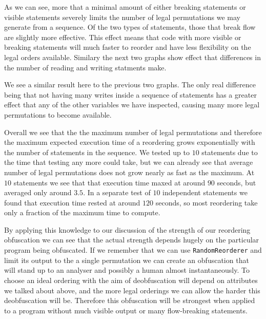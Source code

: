 \documentclass[twoside,a4paper]{report}
\begin{document}
\begin{figure}[h]
\centering
{}
\end{figure}

As we can see, more that a minimal amount of either breaking statements or visible statements severely limits the number of legal permutations we may
generate from a sequence. Of the two types of statements, those that break flow are slightly more effective. This effect means that code with more
visible or breaking statements will much faster to reorder and have less flexibility on the legal orders available. Similary the next two graphs show
effect that differences in the number of reading and writing statments make.

\begin{figure}[h]
\centering
{}
\end{figure}

We see a similar result here to the previous two graphs. The only real difference being that not having many writes inside a sequence of statements
has a greater effect that any of the other variables we have inspected, causing many more legal permutations to become available.

Overall we see that the the maximum number of legal permutations and therefore the maximum expected execution time of a reordering grows exponentially
with the number of statements in the sequence. We tested up to $10$ statements due to the time that testing any more could take, but we can already see
that average number of legal permutations does not grow nearly as fast as the maximum. At $10$ statements we see that that execution time maxed at around
$90$ seconds, but averaged only around $3.5$. In a separate test of $10$ independent statements we found that execution time rested at around $120$ seconds,
so most reordering take only a fraction of the maximum time to compute.

By applying this knowledge to our discussion of the strength of our reordering obfuscation we can see that the actual strength depends hugely on the
particular program being obfuscated. If we remember that we can use \texttt{RandomReorderer} and limit its output to the a single permutation we can
create an obfuscation that will stand up to an analyser and possibly a human almost instantaneously. To choose an ideal ordering with the aim of
deobfuscation will depend on attributes we talked about above, and the more legal orderings we can allow the harder this deobfuscation will be. Therefore
this obfuscation will be strongest when applied to a program without much visible output or many flow-breaking statements.
\end{document}
